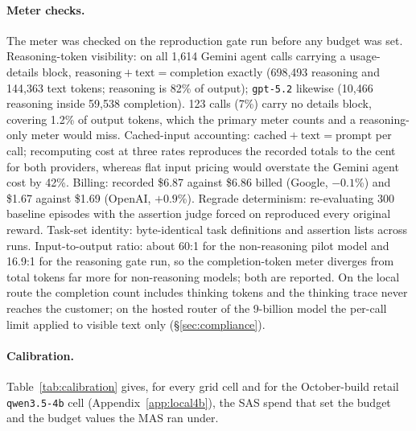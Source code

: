 \paragraph{Meter checks.} The meter was checked on the reproduction gate run before any budget was set. Reasoning-token visibility: on all 1,614 Gemini agent calls carrying a usage-details block, $\text{reasoning} + \text{text} = \text{completion}$ exactly (698,493 reasoning and 144,363 text tokens; reasoning is 82\% of output); \texttt{gpt-5.2} likewise (10,466 reasoning inside 59,538 completion). 123 calls (7\%) carry no details block, covering 1.2\% of output tokens, which the primary meter counts and a reasoning-only meter would miss. Cached-input accounting: $\text{cached} + \text{text} = \text{prompt}$ per call; recomputing cost at three rates reproduces the recorded totals to the cent for both providers, whereas flat input pricing would overstate the Gemini agent cost by 42\%. Billing: recorded \$6.87 against \$6.86 billed (Google, $-0.1$\%) and \$1.67 against \$1.69 (OpenAI, $+0.9$\%). Regrade determinism: re-evaluating 300 baseline episodes with the assertion judge forced on reproduced every original reward. Task-set identity: byte-identical task definitions and assertion lists across runs. Input-to-output ratio: about 60:1 for the non-reasoning pilot model and 16.9:1 for the reasoning gate run, so the completion-token meter diverges from total tokens far more for non-reasoning models; both are reported. On the local route the completion count includes thinking tokens and the thinking trace never reaches the customer; on the hosted router of the 9-billion model the per-call limit applied to visible text only (\S\ref{sec:compliance}).

\paragraph{Calibration.} Table~\ref{tab:calibration} gives, for every grid cell and for the October-build retail \texttt{qwen3.5-4b} cell (Appendix~\ref{app:local4b}), the SAS spend that set the budget and the budget values the MAS ran under.

